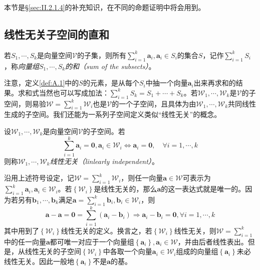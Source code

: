 \documentclass[main.tex]{subfiles}
\begin{document}
本节是\S\ref{sec:II.2.1.4}的补充知识，在不同的命题证明中将会用到。
\subsection{线性无关子空间的直和}
\begin{definition}[向量组的和]\label{def:A.1}
    若$S_1,\cdots,S_k$是向量空间$\mathcal{V}$的子集，则所有$\sum_{i=1}^k\mathbf{a}_i,\mathbf{a}_i\in S_i$的集合$S$，记作$\sum_{i=1}^k S_i$，称\emph{向量组$S_1,\cdots,S_k$的和（sum of the subsects）}。
\end{definition}

注意，定义\ref{def:A.1}中的$S$的元素，是从每个$S_i$中抽一个向量$\mathbf{a}_i$出来再求和的结果。求和式当然也可以写成加法：$\sum_{i=1}^k S_k=S_1+\cdots+S_k$。若$\mathcal{W}_1,\cdots,\mathcal{W}_k$是$\mathcal{V}$的子空间，则易验$\mathcal{W}=\sum_{i=1}^k\mathcal{W}_i$也是$\mathcal{V}$的一个子空间，且具体为由$\mathcal{W}_1,\cdots,\mathcal{W}_k$共同线性生成的子空间。我们还能为一系列子空间定义类似“线性无关”的概念。

\begin{definition}[线性无关子空间]\label{def:A.2}
    设$\mathcal{W}_1,\cdots,\mathcal{W}_k$是向量空间$\mathcal{V}$的子空间。若
    \[\sum_{i=1}^k\mathbf{a}_i=\mathbf{0},\mathbf{a}_i\in\mathcal{W}_i\Leftrightarrow \mathbf{a}_i=\mathbf{0},\quad\forall i=1,\cdots,k\]
    则称$\mathcal{W}_1,\cdots,\mathcal{W}_k$\emph{线性无关（linlearly independent）}。
\end{definition}

沿用上述符号设定，记$\mathcal{W}=\sum_{i=1}^k\mathcal{W}_i$，则任一向量$\mathbf{a}\in\mathcal{W}$可表示为$\sum_{i=1}^k\mathbf{a}_i,\mathbf{a}_i\in\mathcal{W}_i$。若$\left\{\mathcal{W}_i\right\}$是线性无关的，那么$\mathbf{a}$的这一表达式就是唯一的。因为若另有$\mathbf{b}_1,\cdots,\mathbf{b}_k$满足$\mathbf{a}=\sum_{i=1}^k\mathbf{b}_i,\mathbf{b}_i\in\mathcal{W}_i$，则
\[\mathbf{a}-\mathbf{a}=\mathbf{0}=\sum_{i=1}^k\left(\mathbf{a}_i-\mathbf{b}_i\right)\Rightarrow\mathbf{a}_i-\mathbf{b}_i=\mathbf{0},\forall i=1,\cdots,k\]
其中用到了$\left\{\mathcal{W}_i\right\}$线性无关的定义。换言之，若$\left\{\mathcal{W}_i\right\}$线性无关，则$\mathcal{W}=\sum_{i=1}^k$中的任一向量$\mathbf{a}$都可唯一对应于一个向量组$\left\{\mathbf{a}_i\right\},\mathbf{a}_i\in\mathcal{W}$，并由后者线性表出。但是，从线性无关的子空间$\left\{\mathcal{W}_i\right\}$中各取一个向量$\mathbf{a}_i\in\mathcal{W}_i$组成的向量组$\left\{\mathbf{a}_i\right\}$未必线性无关。因此一般地$\left\{\mathbf{a}_i\right\}$不是$\mathbf{a}$的基。
\end{document}
